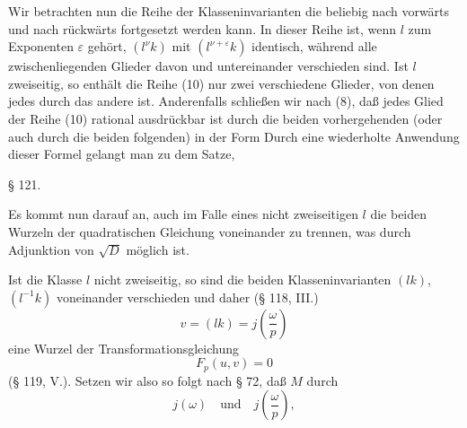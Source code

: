Wir betrachten nun die Reihe der Klasseninvarianten
die beliebig nach vorwärts und nach rückwärts fortgesetzt werden
kann. In dieser Reihe ist, wenn $l$ zum Exponenten $\varepsilon$ gehört,
$(l^{\nu}k)$ mit $(l^{\nu+\varepsilon}k)$ identisch, während alle zwischenliegenden
Glieder davon und untereinander verschieden sind. Ist $l$ zweiseitig, so
enthält die Reihe (10) nur zwei verschiedene Glieder, von denen
jedes durch das andere  ist. Anderenfalls
schließen wir nach (8), daß jedes Glied der Reihe (10) rational
ausdrückbar ist durch die beiden vorhergehenden (oder auch durch
die beiden folgenden) in der Form
Durch eine wiederholte Anwendung dieser Formel gelangt
man zu dem Satze, 


\begin{center}
§ 121. 
\end{center}

Es kommt nun darauf an, auch im Falle eines nicht zweiseitigen
 $l$ die beiden Wurzeln der quadratischen Gleichung voneinander
 zu trennen, was durch Adjunktion von $\sqrt{D}$ möglich ist.

Ist die Klasse $l$ nicht zweiseitig, so sind die beiden Klasseninvarianten
 $(lk)$, $(l^{-1}k)$ voneinander verschieden und daher
(§ 118, III.)
\[
v = (lk) = j\left(\frac{\omega}{p}\right)
\]
eine  Wurzel der Transformationsgleichung
\[
F_p(u, v) = 0
\]
(§ 119, V.). Setzen wir also
so folgt nach § 72, daß $M$  durch
\[
j(\omega) \quad \text{und} \quad j\left(\frac{\omega}{p}\right),
\]
